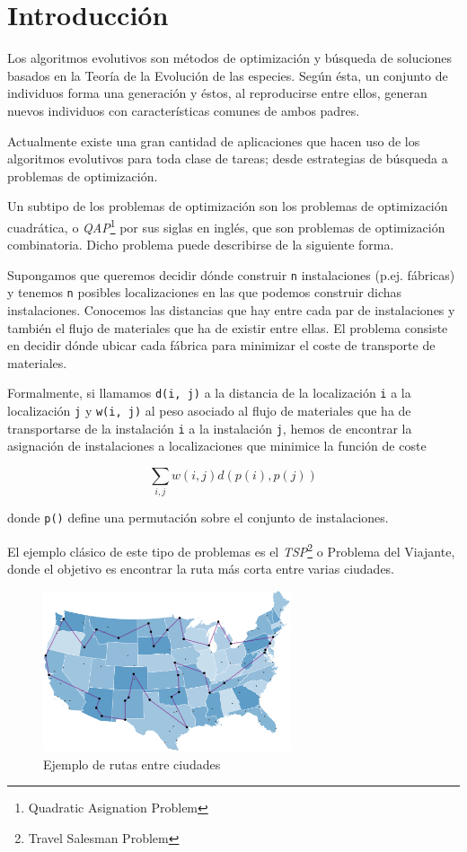 \chapter{Introducción}

Los algoritmos evolutivos son métodos de optimización y búsqueda de soluciones basados en la Teoría de la Evolución de las especies. Según ésta, un conjunto de individuos forma una generación y éstos, al reproducirse entre ellos, generan nuevos individuos con características comunes de ambos padres.

Actualmente existe una gran cantidad de aplicaciones que hacen uso de los algoritmos evolutivos para toda clase de tareas; desde estrategias de búsqueda a problemas de optimización.


Un subtipo de los problemas de optimización son los problemas de optimización cuadrática, o \textit{QAP}\footnote{Quadratic Asignation Problem} por sus siglas en inglés,  que son problemas de optimización combinatoria. Dicho problema puede describirse de la siguiente forma.


Supongamos que queremos decidir dónde construir \texttt{n} instalaciones (p.ej. fábricas) y tenemos \texttt{n} posibles localizaciones en las que podemos construir dichas instalaciones. Conocemos las distancias que hay entre cada par de instalaciones y también el flujo de materiales que ha de existir entre ellas. El problema consiste en decidir dónde ubicar cada fábrica para minimizar el coste de transporte de materiales.


Formalmente, si llamamos \texttt{d(i, j)} a la distancia de la localización \texttt{i} a la localización \texttt{j} y \texttt{w(i, j)} al peso asociado al flujo de materiales que ha de transportarse de la instalación \texttt{i} a la instalación \texttt{j}, hemos de encontrar la asignación de instalaciones a localizaciones que minimice la función de coste

\[ \sum_{i,j} w(i,j) d(p(i),p(j)) \]
\label{formula:sum}

donde \texttt{p()} define una permutación sobre el conjunto de instalaciones.

El ejemplo clásico de este tipo de problemas es el \textit{TSP}\footnote{Travel Salesman Problem} o Problema del Viajante, donde el objetivo es encontrar la ruta más corta entre varias ciudades.


\begin{figure}[H]
  \centering
  \includegraphics[width=0.65\textwidth]{../images/tsp}
  \caption{Ejemplo de rutas entre ciudades}
  \label{fig:tsp}
\end{figure}


